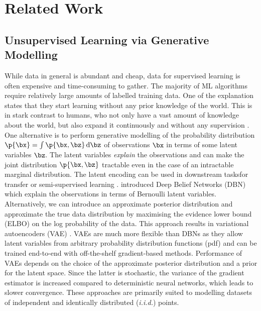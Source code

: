\section{Related Work}
\label{sec:lit}



%
%   
    \subsection{Unsupervised Learning via Generative Modelling}
       While data in general is abundant and cheap, data for supervised learning is often expensive and time-consuming to gather. The majority of ML algorithms require relatively large amounts of labelled training data. One of the explanation states that they start learning without any prior knowledge of the world. This is in stark contrast to humans, who not only have a vast amount of knowledge about the world, but also expand it continuously and without any supervision \citep{Friston2009guide}. One alternative is to perform generative modelling of the probability distribution $\p{\bx} = \int \p{\bx, \bz} \dint \bz$ of observations $\bx$ in terms of some latent variables $\bz$. The latent variables \emph{explain} the observations and can make the joint distribution $\p{\bx, \bz}$ tractable even in the case of an intractable marginal distribution. The latent encoding can be used in downstream tasks\eg for transfer or semi-supervised learning \citep{Pan2010}. \cite{Hinton2006dbn} introduced Deep Belief Networks (DBN) which explain the observations in terms of Bernoulli latent variables. Alternatively, we can introduce an approximate posterior distribution and approximate the true data distribution by maximising the evidence lower bound (ELBO) on the log probability of the data. This approach results in variational autoencoders (VAE) \citep{Kingma2014,Rezende2014}. VAEs are much more flexible than DBNs as they allow latent variables from arbitrary probability distribution functions (pdf) and can be trained end-to-end with off-the-shelf gradient-based methods. Performance of VAEs depends on the choice of the approximate posterior distribution and a prior for the latent space. Since the latter is stochastic, the variance of the gradient estimator is increased compared to deterministic neural networks, which leads to slower convergence. These approaches are primarily suited to modelling datasets of independent and identically distributed (\emph{i.i.d.}) points.
%
%

